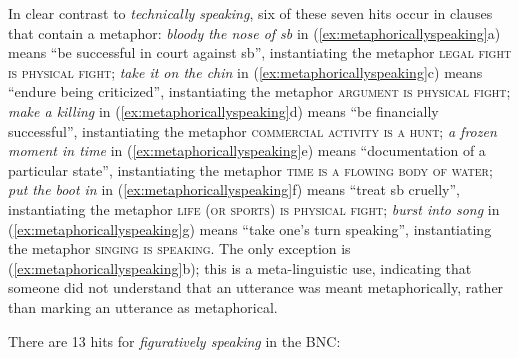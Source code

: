 In clear contrast to \textit{technically speaking}, six of these seven hits occur in clauses that contain a metaphor: \textit{bloody the nose of sb} in (\ref{ex:metaphoricallyspeaking}a) means ``be successful in court against sb'', instantiating the metaphor \textsc{legal fight is physical fight}; \textit{take it on the chin} in (\ref{ex:metaphoricallyspeaking}c) means ``endure being criticized'', instantiating the metaphor \textsc{argument is physical fight}; \textit{make a killing} in (\ref{ex:metaphoricallyspeaking}d) means ``be financially successful'', instantiating the metaphor \textsc{commercial activity is a hunt}; \textit{a frozen moment in time} in (\ref{ex:metaphoricallyspeaking}e) means ``documentation of a particular state'', instantiating the metaphor \textsc{time is a flowing body of water}; \textit{put the boot in} in (\ref{ex:metaphoricallyspeaking}f) means ``treat sb cruelly'', instantiating the metaphor \textsc{life (or sports) is physical fight}; \textit{burst into song} in (\ref{ex:metaphoricallyspeaking}g) means ``take one's turn speaking'', instantiating the metaphor \textsc{singing is speaking}. The only exception is (\ref{ex:metaphoricallyspeaking}b); this is a meta-linguistic use, indicating that someone did not understand that an utterance was meant metaphorically, rather than marking an utterance as metaphorical.

There are 13 hits for \textit{figuratively speaking} in the BNC:


